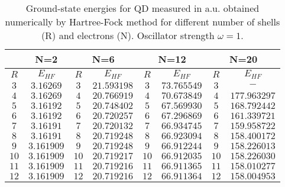 \begin{table}[h!]
	\begin{center}
		\begin{tabular}{|c c| c c| c c| c c|}
			\hline
			\multirow{2}{*}{} & 
			\multicolumn{1}{c}{N=2} \vline& 
			\multicolumn{2}{c}{N=6} \vline&
			\multicolumn{2}{c}{N=12} \vline&
			\multicolumn{2}{c}{N=20} \vline\\
			\hline
			$R$  & $E_{HF}$ & $R$ & $E_{HF}$ & $R$  & $E_{HF}$ &$R$ &  $E_{HF}$  \\
			\hline
			$  3 $   & $3.16269$  &$ 3 $  & $21.593198$  &$  3 $   & $73.765549$   &$ 3$  & $-          $   \\
			$  4 $   & $3.16269$  &$ 4 $  & $20.766919$  &$  4 $   & $70.673849$   &$ 4$  & $177.963297 $   \\
			$  5 $   & $3.16192$  &$ 5 $  & $20.748402$  &$  5 $   & $67.569930$   &$ 5$  & $168.792442 $   \\
			$  6 $   & $3.16192$  &$ 6 $  & $20.720257$  &$  6 $   & $67.296869$   &$ 6$  & $161.339721 $   \\
			$  7 $   & $3.16191$  &$ 7 $  & $20.720132$  &$  7 $   & $66.934745$   &$ 7$  & $159.958722 $   \\
			$  8 $   & $3.16191$  &$ 8 $  & $20.719248$  &$  8 $   & $66.923094$   &$ 8$  & $158.400172 $   \\
			$  9 $   & $3.161909$ &$ 9 $  & $20.719248$  &$  9 $   & $66.912244$   &$ 9$  & $158.226013 $   \\
			$  10$   & $3.161909$ &$ 10$  & $20.719217$  &$  10$   & $66.912035$   &$ 10$ & $158.226030 $   \\
			$  11$   & $3.161909$ &$ 11$  & $20.719216$  &$  11$   & $66.911365$   &$ 11$ & $158.010277 $   \\
			$  12$   & $3.161909$ &$ 12$  & $20.719216$  &$  12$   & $66.911364$   &$ 12$ & $158.004953 $   \\
			\hline                                                                                    
		\end{tabular}
		\caption{ Ground-state energies for QD measured in a.u. obtained numerically by Hartree-Fock method for different number of shells (R) and electrons (N).  Oscillator strength $\omega=1$.}   \label{tab:resultsHF}
	\end{center}
\end{table}


